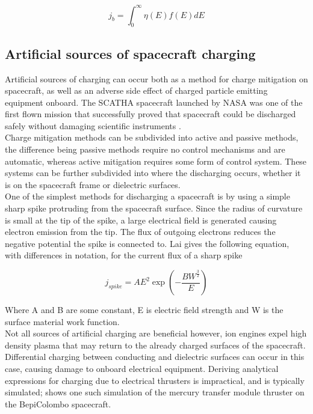 \begin{equation}\label{eq:backscatterE}
    j_b = \int^{\infty}_0 \eta(E) f(E) dE
\end{equation}

\subsection*{Artificial sources of spacecraft charging}
Artificial sources of charging can occur both as a method for charge mitigation on spacecraft, as well as an adverse side effect of charged particle emitting equipment onboard. The SCATHA spacecraft launched by NASA was one of the first flown mission that successfully proved that spacecraft could be discharged safely without damaging scientific instruments  \parencite{Wade}. 
\\
Charge mitigation methods can be subdivided into active and passive methods, the difference being passive methods require no control mechanisms and are automatic, whereas active mitigation requires some form of control system. These systems can be further subdivided into where the discharging occurs, whether it is on the spacecraft frame or dielectric surfaces.
\\
One of the simplest methods for discharging a spacecraft is by using a simple sharp spike protruding from the spacecraft surface. Since the radius of curvature is small at the tip of the spike, a large electrical field is generated causing electron emission from the tip. The flux of outgoing electrons reduces the negative potential the spike is connected to. Lai \parencite{Lai2003} gives the following equation, with differences in notation, for the current flux of a sharp spike 

\begin{equation}
    j_{spike} = A E^2 \exp \left(- \frac{B W^{\frac{3}{2}}}{E} \right)
\end{equation}

Where A and B are some constant, E is electric field strength and W is the surface material work function.
\\
Not all sources of artificial charging are beneficial however, ion engines expel high density plasma that may return to the already charged surfaces of the spacecraft. Differential charging between conducting and dielectric surfaces can occur in this case, causing damage to onboard electrical equipment. Deriving analytical expressions for charging due to electrical thrusters is impractical, and is typically simulated;  shows one such simulation of the mercury transfer module thruster on the BepiColombo spacecraft. 